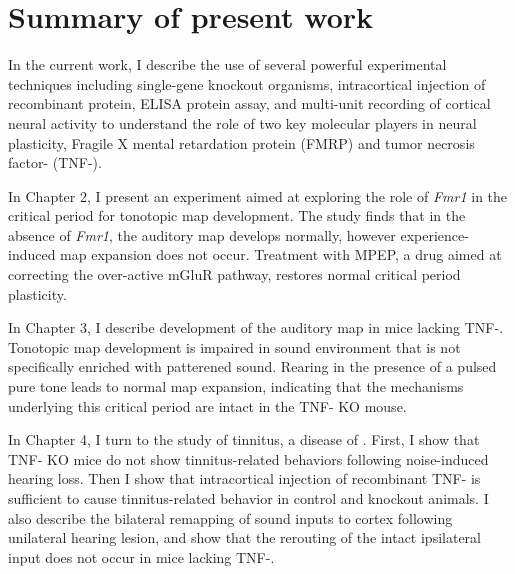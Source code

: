 \section{Summary of present work}

In the current work, I describe the use of several powerful experimental techniques including single-gene knockout organisms, intracortical injection of recombinant protein, ELISA protein assay, and multi-unit recording of cortical neural activity to understand the role of two key molecular players in neural plasticity, Fragile X mental retardation protein (FMRP) and tumor necrosis factor-\textalpha{} (TNF-\textalpha{}).

In Chapter 2, I present an experiment aimed at exploring the role of \textit{Fmr1} in the critical period for tonotopic map development. The study finds that in the absence of \textit{Fmr1}, the auditory map develops normally, however experience-induced map expansion does not occur. Treatment with MPEP, a drug aimed at correcting the over-active mGluR pathway, restores normal critical period plasticity.

In Chapter 3, I describe development of the auditory map in mice lacking TNF-\textalpha{}. Tonotopic map development is impaired in sound environment that is not specifically enriched with patterened sound. Rearing in the presence of a pulsed pure tone leads to normal map expansion, indicating that the mechanisms underlying this critical period are intact in the TNF-\textalpha{} KO mouse.

In Chapter 4, I turn to the study of tinnitus, a disease of . First, I show that TNF-\textalpha{} KO mice do not show tinnitus-related behaviors following noise-induced hearing loss. Then I show that intracortical injection of recombinant TNF-\textalpha{} is sufficient to cause tinnitus-related behavior in control and knockout animals. I also describe the bilateral remapping of sound inputs to cortex following unilateral hearing lesion, and show that the rerouting of the intact ipsilateral input does not occur in mice lacking TNF-\textalpha{}.